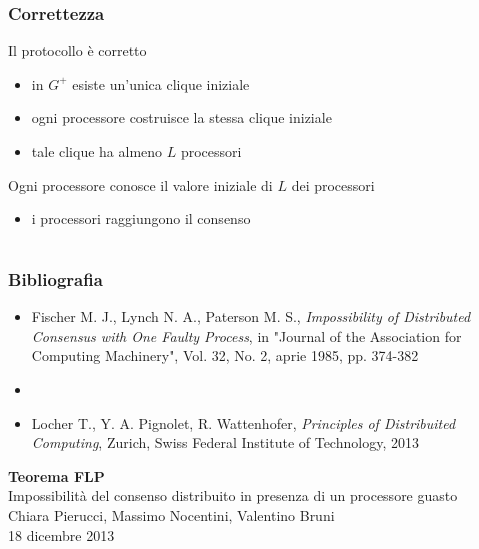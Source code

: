 \documentclass{beamer}
\begin{document}
\begin{frame}\frametitle{Correttezza}
Il protocollo è corretto
\begin{itemize}
\item in $G^+$ esiste un'unica clique iniziale
\item ogni processore costruisce la stessa clique iniziale
\item tale clique ha almeno $L$ processori
\end{itemize}
Ogni processore conosce il valore iniziale di $L$ dei processori
\begin{itemize}
\item i processori raggiungono il consenso
\end{itemize}
\end{frame}

\section*{}
\begin{frame}\frametitle{Bibliografia}
\begin{itemize}
\item Fischer M. J., Lynch N. A., Paterson M. S., \emph{Impossibility of Distributed Consensus with One Faulty Process}, in "Journal of the Association for Computing Machinery", Vol. 32, No. 2, aprie 1985, pp. 374-382
\item[]
\item Locher T., Y. A. Pignolet, R. Wattenhofer, \textit{Principles of Distribuited Computing}, Zurich, Swiss Federal Institute of Technology, 2013
\end{itemize}
\end{frame}

\begin{frame}
\begin{center}
\huge\textbf{Teorema FLP}\\\vspace*{0.5cm}
\scriptsize Impossibilità del consenso distribuito in presenza di un processore guasto\\\vspace*{1cm}
\normalsize Chiara Pierucci, Massimo Nocentini, Valentino Bruni\\\vspace*{.75cm}
18 dicembre 2013
\end{center}
\end{frame}
\end{document}
